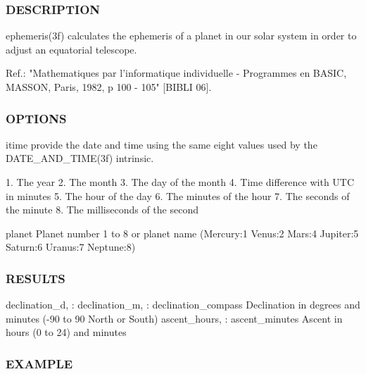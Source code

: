 \subsubsection*{D\+E\+S\+C\+R\+I\+P\+T\+I\+ON}

\begin{DoxyVerb}ephemeris(3f) calculates the ephemeris of a planet in our solar system
in order to adjust an equatorial telescope.

 Ref.: "Mathematiques par l'informatique individuelle
       - Programmes en BASIC, MASSON,
       Paris, 1982, p 100 - 105" [BIBLI 06].
\end{DoxyVerb}


\subsubsection*{O\+P\+T\+I\+O\+NS}

\begin{DoxyVerb}  itime   provide the date and time using the same eight values used
          by the DATE_AND_TIME(3f) intrinsic.

          1. The year
          2. The month
          3. The day of the month
          4. Time difference with UTC in minutes
          5. The hour of the day
          6. The minutes of the hour
          7. The seconds of the minute
          8. The milliseconds of the second

  planet  Planet number  1 to 8  or planet name (Mercury:1 Venus:2
          Mars:4 Jupiter:5 Saturn:6 Uranus:7 Neptune:8)
\end{DoxyVerb}


\subsubsection*{R\+E\+S\+U\+L\+TS}

\begin{DoxyVerb}declination_d,        :
declination_m,        :
declination_compass   Declination in degrees and minutes (-90 to 90 North or South)
ascent_hours,         :
ascent_minutes        Ascent in hours (0 to 24) and minutes
\end{DoxyVerb}


\subsubsection*{E\+X\+A\+M\+P\+LE}

